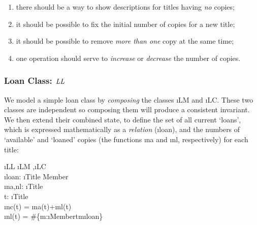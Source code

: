 \documentclass[12pt,a4paper]{article}
\begin{document}
\vspace{-1ex}\begin{enumerate}
\item there should be a way to show descriptions for titles
	having \emph{no} copies;

\item it should be possible to fix the initial number of copies
	for a new title;

\item it should be possible to remove \emph{more than one} copy at the
	same time;

\item one operation should serve to \emph{increase} or \emph{decrease}
	the number of copies.
\end{enumerate}


\newpage
\subsubsection*{Loan Class:
		$\mathit{LL}$}

We model a simple loan class by \emph{composing} the
classes \i{LM} and \i{LC}. These two classes are independent so composing them will produce a consistent invariant.
We then extend their combined state,
to define the set of all current `loans', which is expressed mathematically as a
\emph{relation} (\i{loan}), and the numbers of `available'
and `loaned' copies (the functions \i{na} and \i{nl}, respectively) for each title:
\begin{showspecs}
	\begin{spec}{\i{LL}}
		\i{LM} \sep \i{LC}\\[0.5ex]
		\i{loan}: \i{Title \prel Member}\\[0.5ex]
		\i{na,nl}: \i{Title} \tfun {}\\[0.5ex]
		\forall t: \i{Title}\, \bullet \\
        \hspace{0.5cm}\i{nc}(t) = \i{na}(t)+\i{nl}(t) \,\wedge\\
		\hspace{0.5cm}\i{nl}(t) = \#\{m:\i{Member}\bullet t\mapsto m\in \i{loan}\}
	\end{spec}
\end{showspecs}
\end{document}
